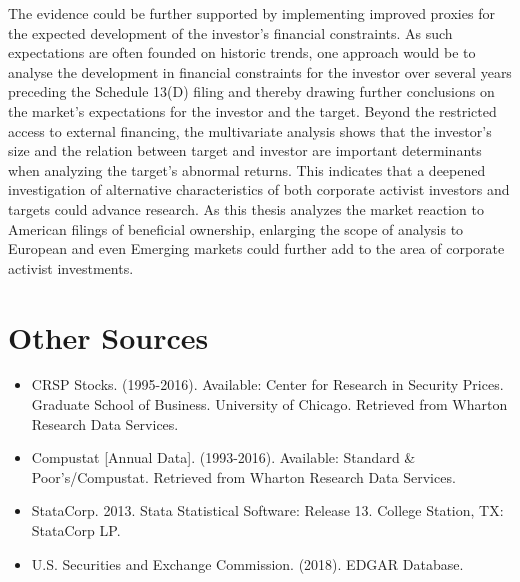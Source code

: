 \documentclass[12pt]{article}
\newcounter{savepage}
\begin{document}
The evidence could be further supported by implementing improved proxies for the expected development of the investor's financial constraints. As such expectations are often founded on historic trends, one approach would be to analyse the development in financial constraints for the investor over several years preceding the Schedule 13(D) filing and thereby drawing further conclusions on the market's expectations for the investor and the target. Beyond the restricted access to external financing, the multivariate analysis shows that the investor's size and the relation between target and investor are important determinants when analyzing the target's abnormal returns. This indicates that a deepened investigation of alternative characteristics of both corporate activist investors and targets could advance research. As this thesis analyzes the market reaction to American filings of beneficial ownership, enlarging the scope of analysis to European and even Emerging markets could further add to the area of corporate activist investments.
\cleardoublepage
{}
\setcounter{page}{\thesavepage}

\printbibliography[title=References]

\section*{Other Sources}
	\begin{itemize}
	\renewcommand\labelitemi{--}

		\item CRSP Stocks. (1995-2016). Available: Center for Research in Security Prices. Graduate School of Business. University of Chicago. Retrieved from Wharton Research Data Services.
		\item Compustat [Annual Data]. (1993-2016). Available: Standard \& Poor's/Compustat. Retrieved from Wharton Research Data Services.
		\item StataCorp. 2013. Stata Statistical Software: Release 13. College Station, TX: StataCorp LP.
		\item U.S. Securities and Exchange Commission. (2018). EDGAR Database.
	\end{itemize}
\end{document}
